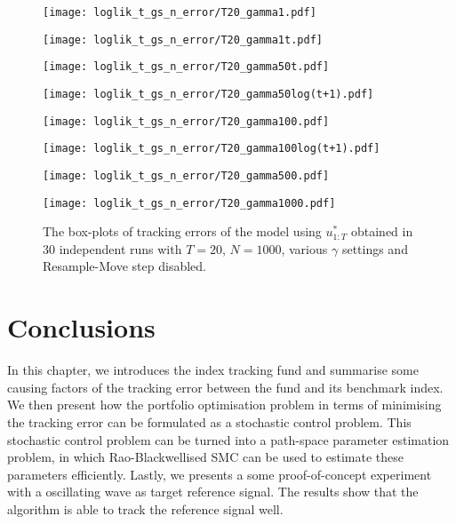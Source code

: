 \begin{figure}[!thbp]
    \centering
    \begin{minipage}{.5\textwidth}
        \centering
        \texttt{[image: loglik\_t\_gs\_n\_error/T20\_gamma1.pdf]}
    \end{minipage}%
    \begin{minipage}{0.5\textwidth}
        \centering
        \texttt{[image: loglik\_t\_gs\_n\_error/T20\_gamma1t.pdf]}
    \end{minipage}
    \begin{minipage}{0.5\textwidth}
        \centering
        \texttt{[image: loglik\_t\_gs\_n\_error/T20\_gamma50t.pdf]}
    \end{minipage}%
    \begin{minipage}{0.5\textwidth}
        \centering
        \texttt{[image: loglik\_t\_gs\_n\_error/T20\_gamma50log(t+1).pdf]}
    \end{minipage}
    \begin{minipage}{0.5\textwidth}
        \centering
        \texttt{[image: loglik\_t\_gs\_n\_error/T20\_gamma100.pdf]}
    \end{minipage}%
    \begin{minipage}{0.5\textwidth}
        \centering
        \texttt{[image: loglik\_t\_gs\_n\_error/T20\_gamma100log(t+1).pdf]}
    \end{minipage}
    \begin{minipage}{0.5\textwidth}
        \centering
        \texttt{[image: loglik\_t\_gs\_n\_error/T20\_gamma500.pdf]}
    \end{minipage}%
    \begin{minipage}{0.5\textwidth}
        \centering
        \texttt{[image: loglik\_t\_gs\_n\_error/T20\_gamma1000.pdf]}
    \end{minipage}
    \caption{The box-plots of tracking errors of the model using $u^*_{1:T}$ obtained in $30$ independent runs with $T=20$, $N=1000$, various $\gamma$ settings and Resample-Move step disabled.}
    \label{fig:error}
\end{figure}

\section{Conclusions}
In this chapter, we introduces the index tracking fund and summarise some causing factors of the tracking error between the fund and its benchmark index. We then present how the portfolio optimisation problem in terms of minimising the tracking error can be formulated as a stochastic control problem. This stochastic control problem can be turned into a path-space parameter estimation problem, in which Rao-Blackwellised SMC can be used to estimate these parameters efficiently. Lastly, we presents a some proof-of-concept experiment with a oscillating wave as target reference signal. The results show that the algorithm is able to track the reference signal well.

